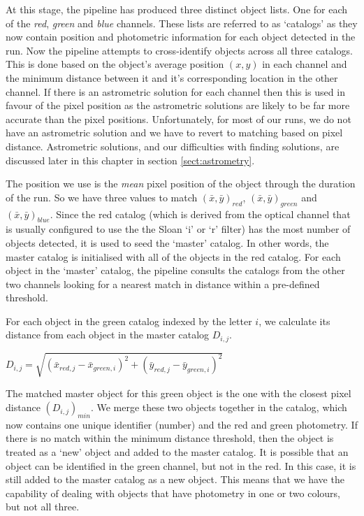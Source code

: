 At this stage, the pipeline has produced three distinct object lists. One for each of the \emph{red}, \emph{green} and \emph{blue} channels. These lists are referred to as `catalogs' as they now contain position and photometric information for each object detected in the run.  Now the pipeline attempts to cross-identify objects across all three catalogs. This is done based on the object's average position $(x, y)$ in each channel and the minimum distance between it and it's corresponding location in the other channel. If there is an astrometric solution for each channel then this is used in favour of the pixel position as the astrometric solutions are likely to be far more accurate than the pixel positions. Unfortunately, for most of our runs, we do not have an astrometric solution and we have to revert to matching based on pixel distance. Astrometric solutions, and our difficulties with finding solutions, are discussed later in this chapter in section \ref{sect:astrometry}.

The position we use is the \emph{mean} pixel position of the object through the duration of the run. So we have three values to match $(\bar{x}, \bar{y})_{red}$, $(\bar{x}, \bar{y})_{green}$ and $(\bar{x}, \bar{y})_{blue}$. Since the red catalog (which is derived from the optical channel that is usually configured to use the the Sloan `i' or `r' filter) has the most number of objects detected, it is used to seed the `master' catalog. In other words, the master catalog is initialised with all of the objects in the red catalog. For each object in the `master' catalog, the pipeline consults the catalogs from the other two channels looking for a nearest match in distance within a pre-defined threshold.

For each object in the green catalog indexed by the letter $i$, we calculate its distance from each object in the master catalog $D_{i,j}$. 

$D_{i,j} = \sqrt{(\bar{x}_{red, j}-\bar{x}_{green, i})^2 + (\bar{y}_{red, j}-\bar{y}_{green, i})^2}$ 

The matched master object for this green object is the one with the closest pixel distance $(D_{i,j})_{min}$. We merge these two objects together in the catalog, which now contains one unique identifier (number) and the red and green photometry. If there is no match within the minimum distance threshold, then the object is treated as a `new' object and added to the master catalog. It is possible that an object can be identified in the green channel, but not in the red. In this case, it is still added to the master catalog as a new object. This means that we have the capability of dealing with objects that have photometry in one or two colours, but not all three. 

